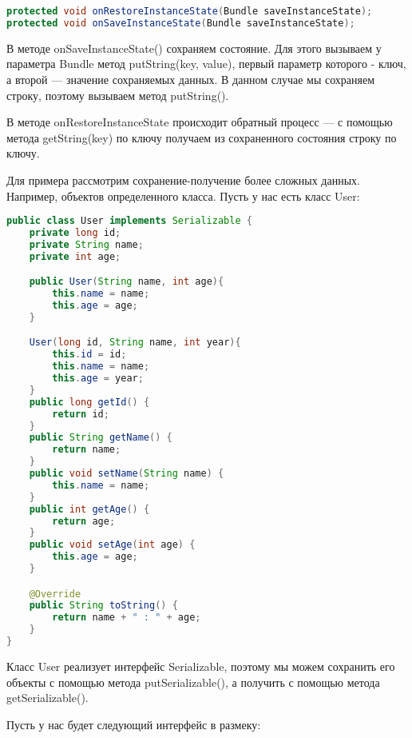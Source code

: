 \begin{lstlisting}[language=Java
	, label=lst:
	]
protected void onRestoreInstanceState(Bundle saveInstanceState);
protected void onSaveInstanceState(Bundle saveInstanceState);
\end{lstlisting}

В методе onSaveInstanceState() сохраняем состояние. Для этого вызываем у
параметра Bundle метод putString(key, value), первый параметр которого -
ключ, а второй --- значение сохраняемых данных. В данном случае мы
сохраняем строку, поэтому вызываем метод putString().\par
В методе onRestoreInstanceState происходит обратный процесс --- с помощью
метода getString(key) по ключу получаем из сохраненного состояния строку
по ключу.\par
Для примера рассмотрим сохранение-получение более сложных данных.
Например, объектов определенного класса. Пусть у нас есть класс User:

\begin{lstlisting}[language=Java
	, label=lst:
	]
public class User implements Serializable {
	private long id;
	private String name;
	private int age;

	public User(String name, int age){
		this.name = name;
		this.age = age;
	}

	User(long id, String name, int year){
		this.id = id;
		this.name = name;
		this.age = year;
	}
	public long getId() {
		return id;
	}
	public String getName() {
		return name;
	}
	public void setName(String name) {
		this.name = name;
	}
	public int getAge() {
		return age;
	}
	public void setAge(int age) {
		this.age = age;
	}

	@Override
	public String toString() {
		return name + " : " + age;
	}
}
\end{lstlisting}

Класс User реализует интерфейс Serializable, поэтому мы можем сохранить
его объекты с помощью метода putSerializable(), а получить с помощью
метода getSerializable().\par
Пусть у нас будет следующий интерфейс в размеку:

